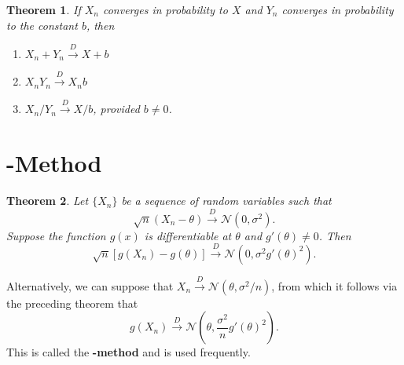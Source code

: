 \documentclass[12pt]{article}
\newcommand{\normal}[2]{\mathcal{N} \left({#1}, {#2} \right)}
\newcommand{\cdist}{\overset{D}{\rightarrow}}
\newtheorem{theorem}{Theorem}
\theoremstyle{definition}
\begin{document}
\begin{theorem}
	If $X_n$ converges in probability to $X$ and $Y_n$ converges in probability to the constant $b$, then
	\begin{enumerate}
		\item $X_n + Y_n \cdist X + b$
		\item $X_nY_n \cdist X_nb$
		\item $X_n/Y_n \cdist X/b$, provided $b \neq 0$.
	\end{enumerate}
\end{theorem}





\section{\bm{$\Delta$}-Method}

\begin{theorem}
	Let $\{X_n\}$ be a sequence of random variables such that
		\[\sqrt{n}(X_n - \theta) \cdist \normal{0}{\sigma^2}.	\]
	Suppose the function $g(x)$ is differentiable at $\theta$ and $g'(\theta) \neq 0$. Then
		\[\sqrt{n}[g(X_n) - g(\theta)] \cdist \normal{0}{ \sigma^2 g'(\theta)^2}.	\]
\end{theorem}

Alternatively, we can suppose that $X_n \cdist \normal{\theta}{\sigma^2/n}$,
from which it follows via the preceding theorem that
		\[	g(X_n) \cdist \normal{\theta}{ \frac{\sigma^2}{n} g'(\theta)^2}.	\]
This is called the \bm{${\Delta}$}\textbf{-method} and is used frequently. 
\end{document}
